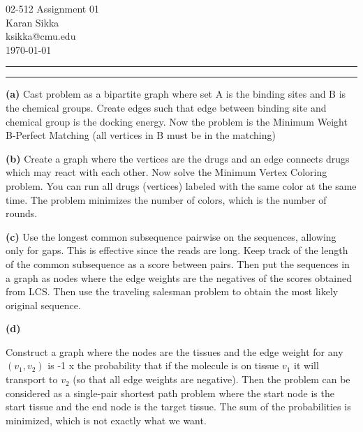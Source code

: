 \documentclass[11pt,letterpaper]{article}
\makeatletter
\newcommand{\question}[1] {\vspace{.25in} \hrule\vspace{0.5em}
\noindent{\bf #1} \vspace{0.5em}
\hrule \vspace{.10in}}
\renewcommand{\part}[1] {\vspace{.10in} {\bf (#1)}}
\newcommand{\myname}{Karan Sikka}
\newcommand{\myandrew}{ksikka@cmu.edu}
\newcommand{\myhwnum}{01}
\makeatother
\begin{document}
\medskip

\thispagestyle{plain}
\begin{center}                  %
{\Large 02-512 Assignment \myhwnum} \\
\myname \\
\myandrew \\
\today
\end{center}

\question{1}
\part{a}
Cast problem as a bipartite graph where set A is the binding sites and B is the chemical groups.
Create edges such that edge between binding site and chemical group is the docking energy.
Now the problem is the Minimum Weight B-Perfect Matching (all vertices in B must be in the matching)


\part{b}
Create a graph where the vertices are the drugs and an edge connects drugs which may react with each other.
Now solve the Minimum Vertex Coloring problem. You can run all drugs (vertices) labeled with the same color at the same time. 
The problem minimizes the number of colors, which is the number of rounds.

\part{c}
Use the longest common subsequence pairwise on the sequences, allowing only for gaps. This is effective since the reads are long.
Keep track of the length of the common subsequence as a score between pairs. Then put the sequences in a graph as nodes where the edge weights are
the negatives of the scores obtained from LCS. Then use the traveling salesman problem to obtain the most likely original sequence.

\part{d}

Construct a graph where the nodes are the tissues and the edge weight for any $(v_1, v_2)$
is -1 x the probability that if the molecule is on tissue $v_1$ it will transport to $v_2$ (so that all edge weights are negative).
Then the problem can be considered as a single-pair shortest path problem where the start node is the start tissue and the end node is the target tissue.
The sum of the probabilities is minimized, which is not exactly what we want.
\end{document}
